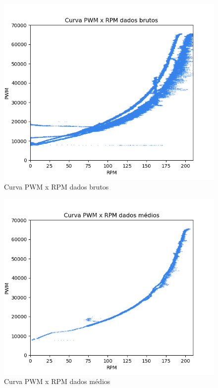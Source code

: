 \begin{figure}[h]
	\centering
	\includegraphics{figures/curva_pwm_x_rpm_dados_brutos}
	\caption{Curva PWM x RPM dados brutos}
	\label{fig:medicao_pwm_x_rpm_dados_brutos}
\end{figure}


\begin{figure}[h]
	\centering
	\includegraphics{figures/curva_pwm_x_rpm_dados_medios}
	\caption{Curva PWM x RPM dados médios}
	\label{fig:medicao_pwm_x_rpm_dados_medios}
\end{figure}



